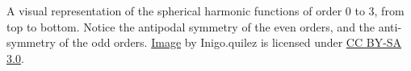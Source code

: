 \label{fig:SphHarm} A visual representation of the spherical harmonic functions of order 0 to 3, from top to bottom. Notice the antipodal symmetry of the even orders, and the anti-symmetry of the odd orders. \href{https://en.wikipedia.org/wiki/File:Spherical_Harmonics.png}{Image} by Inigo.quilez is licensed under \href{https://creativecommons.org/licenses/by-sa/3.0/deed.en}{CC BY-SA 3.0}.